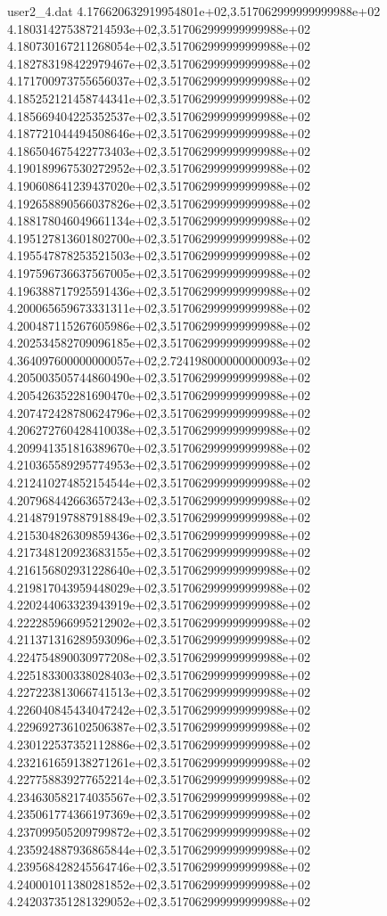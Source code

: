\begin{filecontents}{user2_4.dat}
4.176620632919954801e+02,3.517062999999999988e+02
4.180314275387214593e+02,3.517062999999999988e+02
4.180730167211268054e+02,3.517062999999999988e+02
4.182783198422979467e+02,3.517062999999999988e+02
4.171700973755656037e+02,3.517062999999999988e+02
4.185252121458744341e+02,3.517062999999999988e+02
4.185669404225352537e+02,3.517062999999999988e+02
4.187721044494508646e+02,3.517062999999999988e+02
4.186504675422773403e+02,3.517062999999999988e+02
4.190189967530272952e+02,3.517062999999999988e+02
4.190608641239437020e+02,3.517062999999999988e+02
4.192658890566037826e+02,3.517062999999999988e+02
4.188178046049661134e+02,3.517062999999999988e+02
4.195127813601802700e+02,3.517062999999999988e+02
4.195547878253521503e+02,3.517062999999999988e+02
4.197596736637567005e+02,3.517062999999999988e+02
4.196388717925591436e+02,3.517062999999999988e+02
4.200065659673331311e+02,3.517062999999999988e+02
4.200487115267605986e+02,3.517062999999999988e+02
4.202534582709096185e+02,3.517062999999999988e+02
4.364097600000000057e+02,2.724198000000000093e+02
4.205003505744860490e+02,3.517062999999999988e+02
4.205426352281690470e+02,3.517062999999999988e+02
4.207472428780624796e+02,3.517062999999999988e+02
4.206272760428410038e+02,3.517062999999999988e+02
4.209941351816389670e+02,3.517062999999999988e+02
4.210365589295774953e+02,3.517062999999999988e+02
4.212410274852154544e+02,3.517062999999999988e+02
4.207968442663657243e+02,3.517062999999999988e+02
4.214879197887918849e+02,3.517062999999999988e+02
4.215304826309859436e+02,3.517062999999999988e+02
4.217348120923683155e+02,3.517062999999999988e+02
4.216156802931228640e+02,3.517062999999999988e+02
4.219817043959448029e+02,3.517062999999999988e+02
4.220244063323943919e+02,3.517062999999999988e+02
4.222285966995212902e+02,3.517062999999999988e+02
4.211371316289593096e+02,3.517062999999999988e+02
4.224754890030977208e+02,3.517062999999999988e+02
4.225183300338028403e+02,3.517062999999999988e+02
4.227223813066741513e+02,3.517062999999999988e+02
4.226040845434047242e+02,3.517062999999999988e+02
4.229692736102506387e+02,3.517062999999999988e+02
4.230122537352112886e+02,3.517062999999999988e+02
4.232161659138271261e+02,3.517062999999999988e+02
4.227758839277652214e+02,3.517062999999999988e+02
4.234630582174035567e+02,3.517062999999999988e+02
4.235061774366197369e+02,3.517062999999999988e+02
4.237099505209799872e+02,3.517062999999999988e+02
4.235924887936865844e+02,3.517062999999999988e+02
4.239568428245564746e+02,3.517062999999999988e+02
4.240001011380281852e+02,3.517062999999999988e+02
4.242037351281329052e+02,3.517062999999999988e+02

\end{filecontents}
